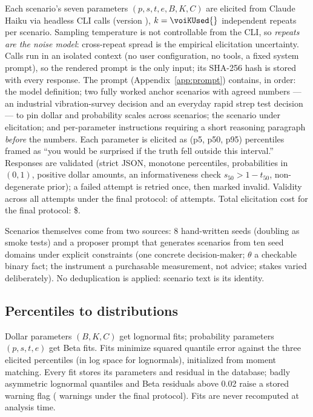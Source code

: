 \documentclass[11pt]{article}
\begin{document}
Each scenario's seven parameters $(p, s, t, e, B, K, C)$ are elicited from
Claude Haiku via headless CLI calls (version \voiCliVersion), $k=\voiKUsed{}$
independent repeats per scenario. Sampling temperature is not controllable
from the CLI, so \emph{repeats are the noise model}: cross-repeat spread is the
empirical elicitation uncertainty. Calls run in an isolated context (no user
configuration, no tools, a fixed system prompt), so the rendered prompt is the
only input; its SHA-256 hash is stored with every response. The prompt
(Appendix~\ref{app:prompt}) contains, in order: the model definition; two fully
worked anchor scenarios with agreed numbers --- an industrial vibration-survey
decision and an everyday rapid strep test decision --- to pin dollar and
probability scales across scenarios; the scenario under elicitation; and
per-parameter instructions requiring a short reasoning paragraph \emph{before}
the numbers. Each parameter is elicited as (p5, p50, p95) percentiles framed
as ``you would be surprised if the truth fell outside this interval.''
Responses are validated (strict JSON, monotone percentiles, probabilities in
$(0,1)$, positive dollar amounts, an informativeness check
$s_{50} > 1 - t_{50}$, non-degenerate prior); a failed attempt is retried
once, then marked invalid. Validity across all attempts under the final
protocol: \voiValidityRate{} of \voiNAttempts{} attempts. Total elicitation
cost for the final protocol: \$\voiElicitCost.

Scenarios themselves come from two sources: 8 hand-written seeds (doubling as
smoke tests) and a proposer prompt that generates scenarios from ten seed
domains under explicit constraints (one concrete decision-maker; $\theta$ a
checkable binary fact; the instrument a purchasable measurement, not advice;
stakes varied deliberately). No deduplication is applied: scenario text is its
identity.

\subsection{Percentiles to distributions}

Dollar parameters $(B, K, C)$ get lognormal fits; probability parameters
$(p, s, t, e)$ get Beta fits. Fits minimize squared quantile error against the
three elicited percentiles (in log space for lognormals), initialized from
moment matching. Every fit stores its parameters and residual in the database;
badly asymmetric lognormal quantiles and Beta residuals above 0.02 raise a
stored warning flag (\voiFitWarnings{} warnings under the final protocol).
Fits are never recomputed at analysis time.
\end{document}
